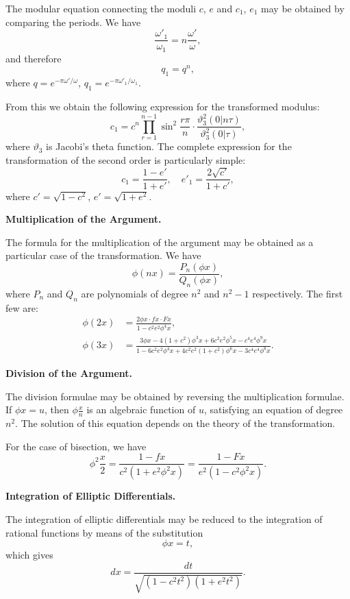 \documentclass[11pt,a4paper]{book}
\begin{document}
The modular equation connecting the moduli $c$, $e$ and $c_1$, $e_1$ may be obtained by
comparing the periods. We have
\[
\frac{\omega'_1}{\omega_1} = n \frac{\omega'}{\omega},
\]
and therefore
\[
q_1 = q^n,
\]
where $q = e^{-\pi \omega'/\omega}$, $q_1 = e^{-\pi \omega'_1/\omega_1}$.

\newpage
\setcounter{page}{147}

From this we obtain the following expression for the transformed modulus:
\[
c_1 = c^n \prod_{r=1}^{n-1} \sin^2 \frac{r\pi}{n} \cdot \frac{\vartheta_3^2(0 | n\tau)}{\vartheta_3^2(0 | \tau)},
\]
where $\vartheta_3$ is Jacobi's theta function. The complete expression for the transformation of
the second order is particularly simple:
\[
c_1 = \frac{1 - e'}{1 + e'},\quad e'_1 = \frac{2\sqrt{c'}}{1 + c'},
\]
where $c' = \sqrt{1 - c^2}$, $e' = \sqrt{1 + e^2}$.

\medskip

\textbf{Multiplication of the Argument.}

The formula for the multiplication of the argument may be obtained as a particular
case of the transformation. We have
\[
\phi(nx) = \frac{P_n(\phi x)}{Q_n(\phi x)},
\]
where $P_n$ and $Q_n$ are polynomials of degree $n^2$ and $n^2 - 1$ respectively. The first few
are:
\begin{align*}
\phi(2x) &= \frac{2\phi x \cdot f x \cdot F x}{1 - c^2 e^2 \phi^4 x},\\
\phi(3x) &= \frac{3\phi x - 4(1 + c^2)\phi^3 x + 6c^2 e^2 \phi^5 x - c^4 e^4 \phi^9 x}{1 - 6c^2 e^2 \phi^4 x + 4c^2 e^2(1 + c^2)\phi^6 x - 3c^4 e^4 \phi^8 x}.
\end{align*}

\newpage
\setcounter{page}{148}

\textbf{Division of the Argument.}

The division formulae may be obtained by reversing the multiplication formulae.
If $\phi x = u$, then $\phi\frac{x}{n}$ is an algebraic function of $u$, satisfying an equation of
degree $n^2$. The solution of this equation depends on the theory of the transformation.

For the case of bisection, we have
\[
\phi^2\frac{x}{2} = \frac{1 - f x}{c^2(1 + e^2 \phi^2 x)} = \frac{1 - F x}{e^2(1 - c^2 \phi^2 x)}.
\]

\medskip

\textbf{Integration of Elliptic Differentials.}

The integration of elliptic differentials may be reduced to the integration of
rational functions by means of the substitution
\[
\phi x = t,
\]
which gives
\[
dx = \frac{dt}{\sqrt{(1 - c^2 t^2)(1 + e^2 t^2)}}.
\]
\end{document}

